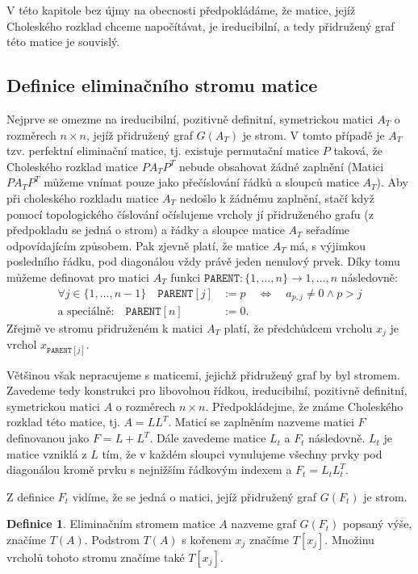 \documentclass[11pt,american,czech,oneside]{book}
\theoremstyle{plain}
\theoremstyle{definition}
\newtheorem{definition}{Definice}
\begin{document}
V této kapitole bez újmy na obecnosti předpokládáme, že matice, jejíž Choleského rozklad chceme napočítávat, je ireducibilní,
a tedy přidružený graf této matice je souvislý.

\subsection{Definice eliminačního stromu matice}

Nejprve se omezme na ireducibilní, pozitivně definitní, symetrickou matici $A_T$ o rozměrech $n \times n$,
jejíž přidružený graf $G(A_T)$ je strom. V tomto případě je $A_T$ tzv. perfektní eliminační matice, tj. existuje permutační matice $P$ taková,
že Choleského rozklad matice $PA_TP^T$ nebude obsahovat žádné zaplnění \cite{rose:72}
(Matici $PA_TP^T$ můžeme vnímat pouze jako přečíslování řádků a sloupců matice $A_T$).
Aby při choleského rozkladu matice $A_T$ nedošlo k žádnému zaplnění, stačí když pomocí topologického číslování očíslujeme vrcholy jí přidruženého grafu (z předpokladu se jedná o strom)
a řádky a sloupce matice $A_T$ seřadíme odpovídajícím způsobem. Pak zjevně platí, že matice $A_T$ má, s výjimkou posledního řádku,
pod diagonálou vždy právě jeden nenulový prvek.
Díky tomu můžeme definovat pro matici $A_T$ funkci $\texttt{PARENT}: \{1,\ldots,n\} \rightarrow {1,\ldots,n}$ následovně:
\begin{align*}
  \forall j \in \{1,\ldots,n-1\} \quad \texttt{PARENT}[j] & := p \quad \Leftrightarrow \quad a_{p,j} \neq 0 \wedge p > j \\
  \text{a speciálně:} \quad \texttt{PARENT}[n] & := 0.
\end{align*}
Zřejmě ve stromu přidruženém k matici $A_T$ platí, že předchůdcem vrcholu $x_j$ je vrchol $x_{\texttt{PARENT}[j]}$.

Většinou však nepracujeme s maticemi, jejichž přidružený graf by byl stromem. Zavedeme tedy konstrukci pro libovolnou
řídkou, ireducibilní, pozitivně definitní, symetrickou matici $A$ o rozměrech $n \times n$.
Předpokládejme, že známe Choleského rozklad této matice, tj. $A = LL^T$. Maticí se zaplněním nazveme matici $F$ definovanou jako $F = L + L^T$.
Dále zavedeme matice $L_t$ a $F_t$ následovně. $L_t$ je matice vzniklá z $L$ tím, že v každém sloupci vynulujeme všechny prvky pod diagonálou
kromě prvku s nejnižším řádkovým indexem a $F_t = L_t L_t^T$.

Z definice $F_t$ vidíme, že se jedná o matici, jejíž přidružený graf $G(F_t)$ je strom.

\begin{definition}
    Eliminačním stromem matice $A$ nazveme graf $G(F_t)$ popsaný výše, značíme $T(A)$.
    Podstrom $T(A)$ s kořenem $x_j$ značíme $T[x_j]$. Množinu vrcholů tohoto stromu značíme také $T[x_j]$.
\end{definition}
\end{document}

